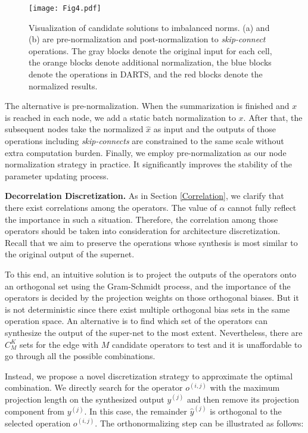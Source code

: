 \documentclass[journal]{IEEEtran}
\begin{document}
\begin{figure}[!hbt]
\begin{center}
\end{center}
	\texttt{[image: Fig4.pdf]}
   \caption{Visualization of candidate solutions to imbalanced norms. (a) and (b) are pre-normalization and post-normalization to \textit{skip-connect} operations. The gray blocks denote the original input for each cell, the orange blocks denote additional normalization, the blue blocks denote the operations in DARTS, and the red blocks denote the normalized results.}
\label{fig:norm}
\end{figure} 

The alternative is pre-normalization. When the summarization is finished and $x$ is reached in each node, we add a static batch normalization to $x$. After that, the subsequent nodes take the normalized $\hat{x}$ as input and the outputs of those operations including \textit{skip-connects} are constrained to the same scale without extra computation burden. Finally, we employ pre-normalization as our node normalization strategy in practice. It significantly improves the stability of the parameter updating process.

 
\textbf{Decorrelation Discretization.} As in Section \ref{Correlation}, we clarify that there exist correlations among the operators. The value of $\alpha$ cannot fully reflect the importance in such a situation. Therefore, the correlation among those operators should be taken into consideration for architecture discretization. Recall that we aim to preserve the operations whose synthesis is most similar to the original output of the supernet. 

To this end, an intuitive solution is to project the outputs of the operators onto an orthogonal set using the Gram-Schmidt process, and the importance of the operators is decided by the projection weights on those orthogonal biases. But it is not deterministic since there exist multiple orthogonal bias sets in the same operation space. An alternative is to find which set of the operators can synthesize the output of the super-net to the most extent. Nevertheless, there are $C_M^K$ sets for the edge with $M$ candidate operators to test and it is unaffordable to go through all the possible combinations. 

Instead, we propose a novel discretization strategy to approximate the optimal combination. We directly search for the operator $o^{(i,j)}$ with the maximum projection length on the synthesized output $y^{(j)}$ and then remove its projection component from $y^{(j)}$. In this case, the remainder  $\hat{y}^{(j)}$ is orthogonal to the selected operation $o^{(i,j)}$. The orthonormalizing step can be illustrated as follows:
\end{document}
